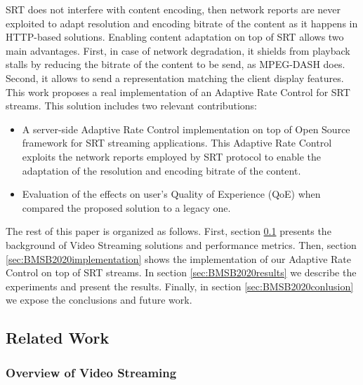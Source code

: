 SRT does not interfere with content encoding, then network reports are never exploited to adapt resolution and encoding bitrate of the content as it happens in HTTP-based solutions. Enabling content adaptation on top of SRT allows two main advantages. First, in case of network degradation, it shields from playback stalls by reducing the bitrate of the content to be send, as MPEG-DASH does. Second, it allows to send a representation matching the client display features. This work proposes a real implementation of an Adaptive Rate Control for SRT streams. This solution includes two relevant contributions:
\begin{itemize}
	\item A server-side Adaptive Rate Control implementation on top of Open Source framework for SRT streaming applications. This Adaptive Rate Control exploits the network reports employed by SRT protocol to enable the adaptation of the resolution and encoding bitrate of the content.
	\item Evaluation of the effects on user's Quality of Experience (QoE) when compared the proposed solution to a legacy one.
\end{itemize}

The rest of this paper is organized as follows. First, section \ref{sec:BMSB2020related} presents the background of Video Streaming solutions and performance metrics. Then, section \ref{sec:BMSB2020implementation} shows the implementation of our Adaptive Rate Control on top of SRT streams. In section \ref{sec:BMSB2020results} we describe the experiments and present the results. Finally, in section \ref{sec:BMSB2020conlusion} we expose the conclusions and future work.


\subsection{Related Work}
\label{sec:BMSB2020related}

\subsubsection{Overview of Video Streaming}
\label{sec:BMSB2020streaming}

